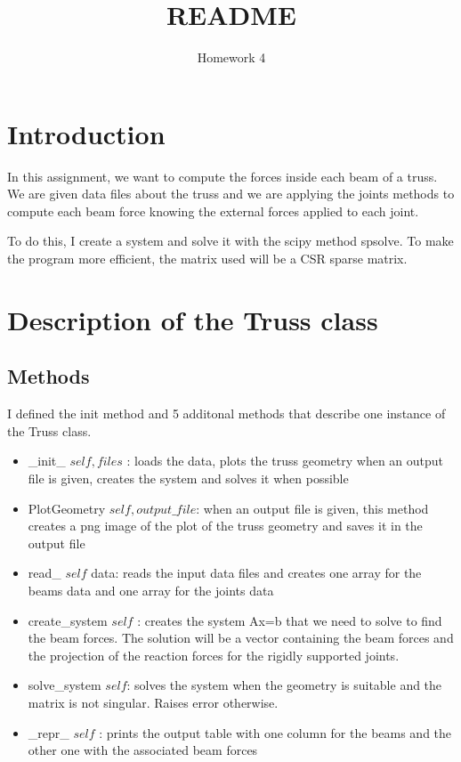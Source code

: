 \documentclass{article}
\title{README}
\author{Homework 4}
\begin{document}
\maketitle


\section{Introduction}

In this assignment, we want to compute the forces inside each beam of a truss. We are given data files about the truss and we are applying the joints methods to compute each beam force knowing the external forces applied to each joint.

To do this, I create a system and solve it with the scipy method spsolve. To make the program more efficient, the matrix used will be a CSR sparse matrix. 

\section{Description of the Truss class}

\subsection{Methods}

I defined the init method and 5 additonal methods that describe one instance of the Truss class.
\begin{itemize}
\item \_{}init\_ \(self, files\) : loads the data, plots the truss geometry when an output file is given, creates the system and solves it when possible
\item PlotGeometry \(self, output\_file\): when an output file is given, this method creates a png image of the plot of the truss geometry and saves it in the output file
\item read\_ \(self\) data: reads the input data files and creates one array for the beams data and one array for the joints data
\item create\_system \(self\) : creates the system Ax=b that we need to solve to find the beam forces. The solution will be a vector containing the beam forces and the projection of the reaction forces for the rigidly supported joints.
\item solve\_system \(self\): solves the system when the geometry is suitable and the matrix is not singular. Raises error otherwise. 
\item \_{repr}\_ \(self\) : prints the output table with one column for the beams and the other one with the associated beam forces
\end{itemize}
\end{document}
